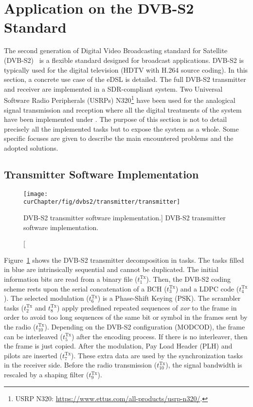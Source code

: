 \section{Application on the DVB-S2 Standard}

The second generation of Digital Video Broadcasting standard for Satellite
(DVB-S2)~\cite{ETSI2005} is a flexible standard designed for broadcast
applications. DVB-S2 is typically used for the digital television (HDTV with
H.264 source coding). In this section, a concrete use case of the \AFFECT eDSL
is detailed. The full DVB-S2 transmitter and receiver are implemented in a
SDR-compliant system. Two Universal Software Radio Peripherals (USRPs)
N320\footnote{USRP N320: \url{https://www.ettus.com/all-products/usrp-n320/}.}
have been used for the analogical signal transmission and reception where all
the digital treatments of the system have been implemented under \AFFECT. The
purpose of this section is not to detail precisely all the implemented tasks
but to expose the system as a whole. Some specific focuses are given to describe
the main encountered problems and the adopted solutions.

\subsection{Transmitter Software Implementation}

\begin{figure}[htp]
  \centering
  \texttt{[image: \\curChapter/fig/dvbs2/transmitter/transmitter]}
  \caption
    [DVB-S2 transmitter software implementation.]
    {DVB-S2 transmitter software implementation.}
  \label{fig:dvbs2_transmitter}
\end{figure}

Figure~\ref{fig:dvbs2_transmitter} shows the DVB-S2 transmitter decomposition in
tasks. The tasks filled in blue are intrinsically sequential and cannot be
duplicated. The initial information bits are read from a binary file
($t^\text{Tx}_1$). Then, the DVB-S2 coding scheme rests upon the serial
concatenation of a BCH ($t^\text{Tx}_3$) and a LDPC code ($t^\text{Tx}_4$). The
selected modulation ($t^\text{Tx}_6$) is a Phase-Shift Keying (PSK). The
scrambler tasks ($t^\text{Tx}_2$ and $t^\text{Tx}_8$) apply predefined repeated
sequences of \emph{xor} to the frame in order to avoid too long sequences of the
same bit or symbol in the frames sent by the radio ($t^\text{Tx}_{10}$).
Depending on the DVB-S2 configuration (MODCOD), the frame can be interleaved
($t^\text{Tx}_5$) after the encoding process. If there is no interleaver, then
the frame is just copied. After the modulation, Pay Load Header (PLH) and
pilots are inserted ($t^\text{Tx}_7$). These extra data are used by the
synchronization tasks in the receiver side. Before the radio transmission
($t^\text{Tx}_{10}$), the signal bandwidth is rescaled by a shaping filter
($t^\text{Tx}_9$).

